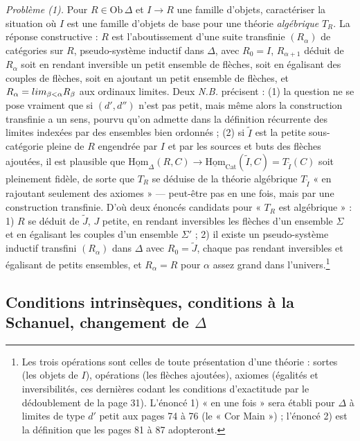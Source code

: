 \documentclass[11pt,a4paper]{article}
\begin{document}
\emph{Problème (1).} Pour $R \in \mathrm{Ob}\,\Delta$ et $I \to R$ une famille
d'objets, caractériser la situation où $I$ est une famille d'objets de base
pour une théorie \emph{algébrique} $T_{R}$. La réponse constructive : $R$
est l'aboutissement d'une suite transfinie $(R_{\alpha})$ de catégories sur
$R$, pseudo-système inductif dans $\Delta$, avec $R_{0} = I$, $R_{\alpha+1}$
déduit de $R_{\alpha}$ soit en rendant inversible un petit ensemble de
flèches, soit en égalisant des couples de flèches, soit en ajoutant un
petit ensemble de flèches, et $R_{\alpha} = \varinjlim_{\beta < \alpha}
R_{\beta}$ aux ordinaux limites. Deux \emph{N.B.} précisent : (1) la
question ne se pose vraiment que si $(d', d'')$ n'est pas petit, mais même
alors la construction transfinie a un sens, pourvu qu'on admette dans la
définition récurrente des limites indexées par des ensembles bien
ordonnés ; (2) si $\widetilde{I}$ est la petite sous-catégorie pleine de $R$
engendrée par $I$ et par les sources et buts des flèches ajoutées, il est
plausible que $\underline{\mathrm{Hom}}_{\Delta}(R, C) \to
\underline{\mathrm{Hom}}_{\mathrm{Cat}}(\widetilde{I}, C) = T_{\widetilde{I}}
(C)$ soit pleinement fidèle, de sorte que $T_{R}$ se déduise de la théorie
algébrique $T_{\widetilde{I}}$ « en rajoutant seulement des axiomes » —
peut-être pas en une fois, mais par une construction transfinie. D'où deux
énoncés candidats pour « $T_{R}$ est algébrique » : 1) $R$ se déduit de
$\widetilde{J}$, $J$ petite, en rendant inversibles les flèches d'un
ensemble $\Sigma$ et en égalisant les couples d'un ensemble $\Sigma'$ ;
2) il existe un pseudo-système inductif transfini $(R_{\alpha})$ dans
$\Delta$ avec $R_{0} = \widetilde{J}$, chaque pas rendant inversibles et
égalisant de petits ensembles, et $R_{\alpha} = R$ pour $\alpha$ assez
grand dans l'univers.\footnote{Les trois opérations sont celles de toute
présentation d'une théorie : sortes (les objets de $I$), opérations (les
flèches ajoutées), axiomes (égalités et inversibilités, ces dernières
codant les conditions d'exactitude par le dédoublement de la page 31).
L'énoncé 1) « en une fois » sera établi pour $\Delta$ à limites de type
$d'$ petit aux pages 74 à 76 (le « Cor Main ») ; l'énoncé 2) est la
définition que les pages 81 à 87 adopteront.}

\subsection*{Conditions intrinsèques, conditions à la Schanuel, changement de $\Delta$}
\end{document}
